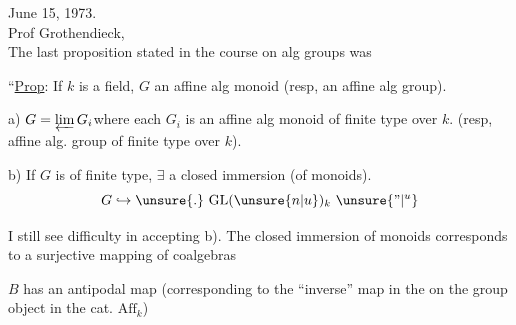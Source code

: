 \hfill June 15, 1973.\\
Prof Grothendieck,\\

The last proposition stated in the course on alg groups was\unsure{\textsuperscript{-}|\textsuperscript{,}}

``\uline{Prop}: If $k$ is a field, $G$ an affine alg monoid (resp, an affine alg group).

a) $G=\varprojlim G_i$\qquad where each $G_i$ is an affine alg monoid of finite type over $k$. (resp, affine alg. group of finite type over $k$).

b) If $G$ is of finite type, $\exists$ a closed immersion (of monoids).
\[
G\hookrightarrow\unsure{.}\ \mathrm{GL}(\unsure{n|u})_k\ \unsure{\text{''}|{}^{u}}
\]

I still see difficulty in accepting b). The closed immersion of monoids corresponds to a surjective mapping of coalgebras

$B$ has an antipodal map (corresponding to the ``inverse'' map in the on the group object in the cat. $\mathrm{Aff}_k$)
\clearpage
